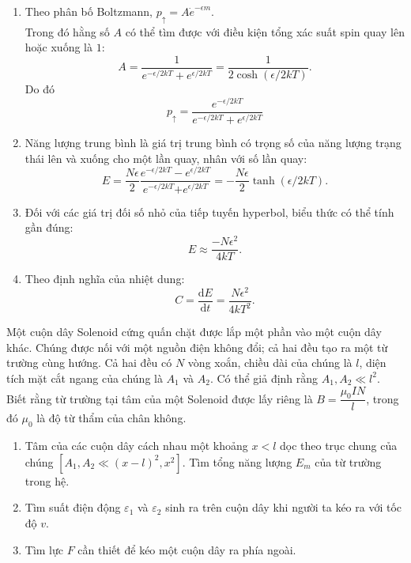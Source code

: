 \begin{loigiai}
    \begin{enumerate}[1)]
        \item Theo phân bố Boltzmann, $p_\uparrow=A\dot e^{-\epsilon m}$.
        \\ Trong đó hằng số $A$ có thể tìm được với điều kiện tổng xác suất spin quay lên hoặc xuống là $1$:
        \[A = \frac{1}{{{e^{ - \epsilon /2kT}}} + {e^{\epsilon /2kT}}} = \frac{1}{{2\cosh \left( {\epsilon /2kT} \right)}}.\]
        Do đó 
        \[{p_ \uparrow } = \dfrac{{{e^{-\epsilon/2kT} }}}{{{e^{-\epsilon/2kT}} + {e^{\epsilon/2kT}}}}\]
        \item Năng lượng trung bình là giá trị trung bình có trọng số của năng lượng trạng thái lên và xuống cho một lần quay, nhân với số lần quay:
        \[E = \frac{{N\epsilon }}{2}\frac{{{e^{ - \epsilon /2kT}} - {e^{\epsilon /2kT}}}}{{{e^{ - \epsilon /2kT}}{ + e^{\epsilon /2kT}}}} =  - \frac{{N\epsilon }}{2}\tanh \left( {\epsilon /2kT} \right).\]
        \item Đối với các giá trị đối số nhỏ của tiếp tuyến hyperbol, biểu thức có thể tính gần đúng:
        \[E \approx \frac{{ - N{\epsilon ^2}}}{{4kT}}.\]
        \item Theo định nghĩa của nhiệt dung:
        \[C = \dfrac{\mathrm{d}E}{\mathrm{d}t} = \frac{{N{\epsilon ^2}}}{{4k{T^2}}}.\]
    \end{enumerate}
\end{loigiai}

\begin{vd}
    Một cuộn dây Solenoid cứng quấn chặt được lắp một phần vào một cuộn dây khác. Chúng được nối với một nguồn điện không đổi; cả hai đều tạo ra một từ trường cùng hướng. Cả hai đều có $N$ vòng xoắn, chiều dài của chúng là $l$, diện tích mặt cắt ngang của chúng là $A_1$ và $A_2$. Có thể giả định rằng $A_1, A_2 \ll l^2$.
    \\Biết rằng từ trường tại tâm của một Solenoid được lấy riêng là $B =\dfrac{\mu_0 IN}{l}$, trong đó $\mu_0$ là độ từ thẩm của chân không.
    \begin{enumerate}[1)]
        \item Tâm của các cuộn dây cách nhau một khoảng $x<l$ dọc theo trục chung của chúng $\left[A_1, A_2 \ll (x-l)^2, x^2\right]$. Tìm tổng năng lượng $E_m$ của từ trường trong hệ.
        \item Tìm suất điện động $\varepsilon_1$ và $\varepsilon_2$ sinh ra trên cuộn dây khi người ta kéo ra với tốc độ $v$.
        \item Tìm lực $F$ cần thiết để kéo một cuộn dây ra phía ngoài.
    \end{enumerate}
\end{vd}

